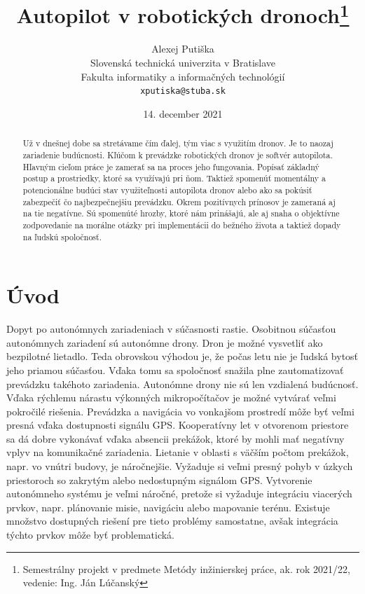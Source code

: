 \documentclass[10pt,twoside,slovak,a4paper]{article}
\title{Autopilot v robotických dronoch\thanks{Semestrálny projekt v predmete Metódy inžinierskej práce, ak. rok 2021/22, vedenie: Ing. Ján Lúčanský}}
\author{Alexej Putiška\\[2pt]
	{\small Slovenská technická univerzita v Bratislave}\\
	{\small Fakulta informatiky a informačných technológií}\\
	{\small \texttt{xputiska@stuba.sk}}
	}
\date{\small 14. december 2021}
\begin{document}
\maketitle

\begin{abstract}
Už v dnešnej dobe sa stretávame čím ďalej, tým viac s využitím dronov. Je to naozaj zariadenie budúcnosti. Kľúčom k prevádzke robotických dronov je softvér autopilota. Hľavným cieľom práce je zamerať sa na proces jeho fungovania. Popísať základný postup a prostriedky, ktoré sa využívajú pri ňom. Taktiež spomenúť momentálny a potencionálne budúci stav využiteľnosti autopilota dronov alebo ako sa pokúsiť zabezpečiť čo najbezpečnejšiu prevádzku. Okrem pozitívnych prínosov je zameraná aj na tie negatívne. Sú spomenúté hrozby, ktoré nám prinášajú, ale aj snaha o objektívne zodpovedanie na morálne otázky pri implementácii do bežného života a taktiež dopady na ľudskú spoločnosť.
\end{abstract}


\section{Úvod}
Dopyt po autonómnych zariadeniach v súčasnosti rastie. Osobitnou súčasťou autonómnych zariadení sú autonómne drony. Dron je možné vysvetliť ako bezpilotné lietadlo. Teda obrovskou výhodou je, že počas letu nie je ľudská bytosť jeho priamou súčasťou. Vďaka tomu sa spoločnosť snažila plne zautomatizovať prevádzku takéhoto zariadenia. Autonómne drony nie sú len vzdialená budúcnosť. Vďaka rýchlemu nárastu výkonných mikropočítačov je možné vytvárať veľmi pokročilé riešenia. \cite{smyczynski2017autonomous} Prevádzka a navigácia vo vonkajšom prostredí môže byť veľmi presná vďaka dostupnosti signálu GPS. Kooperatívny let v otvorenom priestore sa dá dobre vykonávať vďaka absencii prekážok, ktoré by mohli mať negatívny vplyv na komunikačné zariadenia. Lietanie v oblasti s väčším počtom prekážok, napr. vo vnútri budovy, je náročnejšie. Vyžaduje si veľmi presný pohyb v úzkych priestoroch so zakrytým alebo nedostupným signálom GPS. \cite{pestana2015vision} Vytvorenie autonómneho systému je veľmi náročné, pretože si vyžaduje integráciu viacerých prvkov, napr. plánovanie misie, navigáciu alebo mapovanie terénu. Existuje množstvo dostupných riešení pre tieto problémy samostatne, avšak integrácia týchto prvkov môže byť problematická. \cite{sanchez2017multi}
\end{document}
